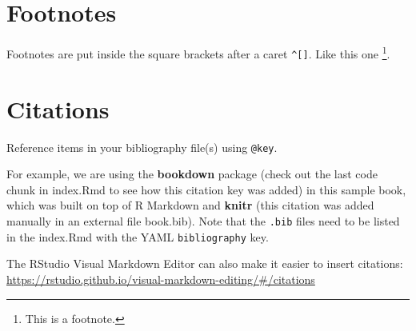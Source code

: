 \documentclass[
]{book}
\begin{document}
\hypertarget{footnotes-3}{%
\section{Footnotes}\label{footnotes-3}}

Footnotes are put inside the square brackets after a caret \texttt{\^{}{[}{]}}. Like this one \footnote{This is a footnote.}.

\hypertarget{citations-3}{%
\section{Citations}\label{citations-3}}

Reference items in your bibliography file(s) using \texttt{@key}.

For example, we are using the \textbf{bookdown} package (check out the last code chunk in index.Rmd to see how this citation key was added) in this sample book, which was built on top of R Markdown and \textbf{knitr} \citep{xie2015} (this citation was added manually in an external file book.bib).
Note that the \texttt{.bib} files need to be listed in the index.Rmd with the YAML \texttt{bibliography} key.

The RStudio Visual Markdown Editor can also make it easier to insert citations: \url{https://rstudio.github.io/visual-markdown-editing/\#/citations}

  
\end{document}
